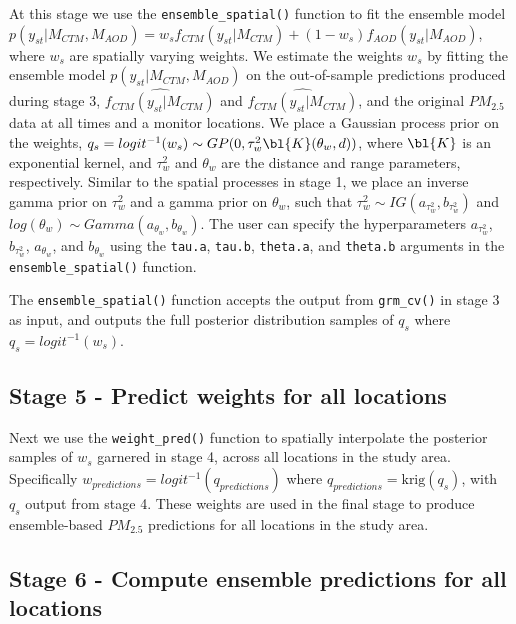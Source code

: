 At this stage we use the \texttt{ensemble\_spatial()} function to fit the ensemble model  $p(y_{st} | M_{CTM}, M_{AOD}) = w_s f_{CTM}(y_{st} | M_{CTM}) + (1-w_s) f_{AOD}(y_{st}|M_{AOD})$, where $w_s$ are spatially varying weights.
We estimate the weights $w_s$ by fitting the ensemble model $p(y_{st} | M_{CTM}, M_{AOD})$ on the out-of-sample predictions produced during stage 3, $\widehat{f_{CTM}(y_{st} | M_{CTM})}$ and $\widehat{f_{CTM}(y_{st} | M_{CTM})}$, and the original $PM_{2.5}$ data at all times and a monitor locations.
We place a Gaussian process prior on the weights, $q_s = logit^{-1}(w_s) \sim GP(0, \tau^2_w  \bl{K}(\theta_w, d))$, where $\bl{K}$ is an exponential kernel, and $\tau^2_w$ and $\theta_w$ are the distance and range parameters, respectively.
Similar to the spatial processes in stage 1, we place an inverse gamma prior on $\tau^2_w$ and a gamma prior on $\theta_w$, such that $\tau^2_w \sim IG(a_{\tau^2_w}, b_{\tau^2_w})$ and $log(\theta_w) \sim Gamma(a_{\theta_w}, b_{\theta_w})$.
The user can specify the hyperparameters $a_{\tau^2_w}$, $b_{\tau^2_w}$, $a_{\theta_w}$, and $b_{\theta_w}$ using the \texttt{tau.a}, \texttt{tau.b}, \texttt{theta.a}, and \texttt{theta.b} arguments in the \texttt{ensemble\_spatial()} function.

The \texttt{ensemble\_spatial()} function accepts the output from \texttt{grm\_cv()} in stage 3 as input, and outputs the full posterior distribution samples of $q_s$ where $q_s = logit^{-1}(w_s)$. 

\subsection*{Stage 5 - Predict weights for all locations}

Next we use the \texttt{weight\_pred()} function to spatially interpolate the posterior samples of $w_s$ garnered in stage 4, across all locations in the study area. 
Specifically $w_{predictions} = logit^{-1}(q_{predictions})$ where $q_{predictions} = \text{krig}(q_s)$, with $q_s$ output from stage 4.
These weights are used in the final stage to produce ensemble-based $PM_{2.5}$ predictions for all locations in the study area.





\subsection*{Stage 6 - Compute ensemble predictions for all locations}

